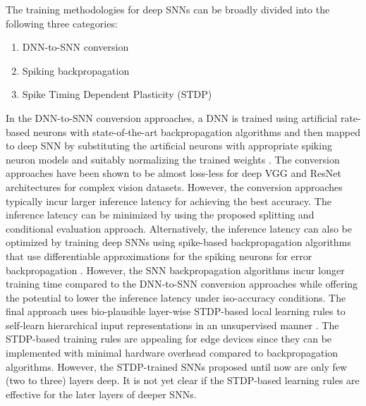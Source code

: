 The training methodologies for deep SNNs can be broadly divided into the following three categories:
\begin{enumerate}
    \item DNN-to-SNN conversion
    \item Spiking backpropagation
    \item Spike Timing Dependent Plasticity (STDP)
\end{enumerate}
In the DNN-to-SNN conversion approaches, a DNN is trained using artificial rate-based neurons with state-of-the-art backpropagation algorithms and then mapped to deep SNN by substituting the artificial neurons with appropriate spiking neuron models and suitably normalizing the trained weights \cite{cao2015spiking, hunsberger2015spiking, diehl2015fast, rueckauer2017conversion, sengupta2019going}. The conversion approaches have been shown to be almost loss-less for deep VGG and ResNet architectures for complex vision datasets. However, the conversion approaches typically incur larger inference latency for achieving the best accuracy. The inference latency can be minimized by using the proposed splitting and conditional evaluation approach. Alternatively, the inference latency can also be optimized by training deep SNNs using spike-based backpropagation algorithms that use differentiable approximations for the spiking neurons for error backpropagation \cite{lee2016training, panda2016unsupervised, wu2018spatio, lee2018training, jin2018hybrid, shrestha2018slayer, neftci2019surrogate}. However, the SNN backpropagation algorithms incur longer training time compared to the DNN-to-SNN conversion approaches while offering the potential to lower the inference latency under iso-accuracy conditions. The final approach uses bio-plausible layer-wise STDP-based local learning rules to self-learn hierarchical input representations in an unsupervised manner \cite{diehl2015unsupervised, masquelier2007unsupervised, srinivasan2018stdp, tavanaei2018training, kheradpisheh2018stdp, ferre2018unsupervised, thiele2018event, lee2018deep, mozafari2018combining}. The STDP-based training rules are appealing for edge devices since they can be implemented with minimal hardware overhead compared to backpropagation algorithms. However, the STDP-trained SNNs proposed until now are only few (two to three) layers deep. It is not yet clear if the STDP-based learning rules are effective for the later layers of deeper SNNs.


